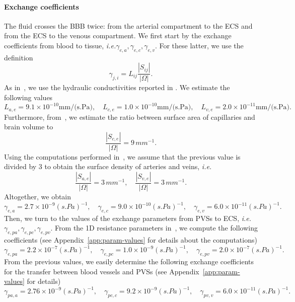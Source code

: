 \documentclass[10pt,letterpaper]{article}
\newcommand{\ie}{\emph{i.e.}\;}
\newcommand{\1}{^{(1)}}
\newcommand{\2}{^{(2)}}
\newcommand{\abs}[1]{\left\lvert#1\right\rvert}
\begin{document}

\paragraph{Exchange coefficients}
The fluid crosses the BBB twice: from the arterial compartment to the ECS and from the ECS to the venous compartment. 
We first start by the exchange coefficients from blood to tissue, \ie $\gamma_{e, a}, \gamma_{e, c}, \gamma_{e, v}$. 
For these latter, we use the definition
\[
    \gamma_{j, i} = L_{ij} \frac{\abs{S_{ij}}}{\abs{\Omega}}. 
\]
As in~\cite{shi-2014-Quantification}, we use the hydraulic conductivities reported in \cite{fraser1990measurement, kimura1993measurement, roberts2009ppar}. We estimate the following values  
\[
    L_{a,e} = 9.1 \times 10^{-10} \text{mm/(s.Pa)},\quad L_{c,e} = 1.0\times 10^{-10} \text{mm/(s.Pa)},\quad L_{v,e} = 2.0 \times 10^{-11} \text{mm/(s.Pa)}.
\]
Furthermore, from~\cite{smith2007interstitial}, we estimate the ratio between surface area of capillaries and brain volume to 
\[
    \frac{\abs{S_{c,e}}}{\abs{\Omega}} =   9 \, \si{mm^{-1}}.
\]
Using the computations performed in~\cite{el-bouri-conferencepaper}, we assume that the previous value is divided by 3 to obtain the surface density of arteries and veins, \ie
\[
\frac{\abs{S_{a,e}}}{\abs{\Omega}} =   3 \, \si{mm^{-1}},\quad \frac{\abs{S_{v,e}}}{\abs{\Omega}} =   3 \, \si{mm^{-1}}.
\]
Altogether, we obtain 
\[
\gamma_{e , a} = 2.7 \times 10^{-9} \si{(s.Pa)^{-1} },\quad  \gamma_{e, c} =9.0 \times 10^{-10} \si{(s.Pa)^{-1} },\quad  \gamma_{e, v} = 6.0  \times 10^{-11} \si{(s.Pa)^{-1}}.
\]
Then, we turn to the values of the exchange parameters from PVSs to ECS, \ie $\gamma_{e, pa}, \gamma_{e, pc}, \gamma_{e, pv}$. From the 1D resistance parameters in~\cite{Vinje-2020-ICP}, we compute the following coefficients (see Appendix~\ref{app:param-values} for details about the computations) 
\[
\gamma_{e , pa} = 2.2 \times 10^{-7} \si{(s.Pa)^{-1} },\quad  \gamma_{e, pc} = 1.0 \times 10^{-9} \si{(s.Pa)^{-1} },\quad  \gamma_{e, pv} = 2.0 \times 10^{-7} \si{(s.Pa)^{-1} }.
\]
From the previous values, we easily determine the following exchange coefficients for the transfer between blood vessels and PVSs (see Appendix~\ref{app:param-values} for details)
\[ 
\gamma_{pa , a} = 2.76\times 10^{-9} \si{(s.Pa)^{-1} },\quad  \gamma_{pc, c} = 9.2 \times 10^{-9} \si{(s.Pa)^{-1} },\quad  \gamma_{pv, v} = 6.0 \times 10^{-11} \si{(s.Pa)^{-1} }.
\]
\end{document}
